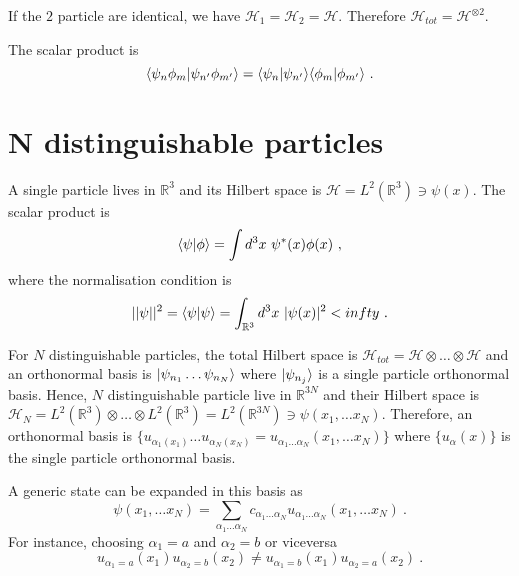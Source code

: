     If the $2$ particle are identical, we have $\mathcal H_1 = \mathcal H_2 = \mathcal H$. Therefore $\mathcal H_{tot} = \mathcal H^{\otimes 2}$.

    The scalar product is 
    \begin{equation*}
        \langle\psi_n \phi_m\vert\psi_{n'} \phi_{m'}\rangle = \langle\psi_n\vert\psi_{n'}\rangle \langle\phi_m\vert\phi_{m'}\rangle ~.
    \end{equation*}

\section{N distinguishable particles}

    A single particle lives in $\mathbb R^3$ and its Hilbert space is $\mathcal H = L^2 (\mathbb R^3) \ni \psi(x)$. The scalar product is 
    \begin{equation*}
        \langle\psi\vert\phi\rangle = \int d^3 x ~ \psi^*(x) \phi(x) ~,
    \end{equation*}
    where the normalisation condition is 
    \begin{equation*}
        ||\psi||^2 = \langle\psi\vert\psi\rangle = \int_{\mathbb R^3} d^3 x ~ |\psi(x)|^2 < infty ~.
    \end{equation*}

    For $N$ distinguishable particles, the total Hilbert space is $\mathcal H_{tot} = \mathcal H \otimes \ldots \otimes \mathcal H$ and an orthonormal basis is $\vert\psi_{n_1} \ldots \psi_{n_N}\rangle$ where $\vert\psi_{n_j}\rangle$ is a single particle orthonormal basis. Hence, $N$ distinguishable particle live in $\mathbb R^{3N}$ and their Hilbert space is $\mathcal H_N = L^2(\mathbb R^3) \otimes \ldots \otimes L^2(\mathbb R^3) = L^2 (\mathbb R^{3N}) \ni \psi(x_1, \ldots x_N)$. Therefore, an orthonormal basis is $\{u_{\alpha_1 (x_1)} \ldots u_{\alpha_N (x_N)} = u_{\alpha_1 \ldots \alpha_N} (x_1, \ldots x_N)\}$ where $\{u_\alpha (x)\}$ is the single particle orthonormal basis.

    A generic state can be expanded in this basis as 
    \begin{equation*}
        \psi(x_1, \ldots x_N) = \sum_{\alpha_1 \ldots \alpha_N} c_{\alpha_1 \ldots \alpha_N} u_{\alpha_1 \ldots \alpha_N} (x_1, \ldots x_N) ~.
    \end{equation*}
    For instance, choosing $\alpha_1 = a$ and $\alpha_2 = b$ or viceversa
    \begin{equation*}
        u_{\alpha_1 = a} (x_1) u_{\alpha_2 = b} (x_2) \neq u_{\alpha_1 = b} (x_1) u_{\alpha_2 = a} (x_2) ~.
    \end{equation*}


